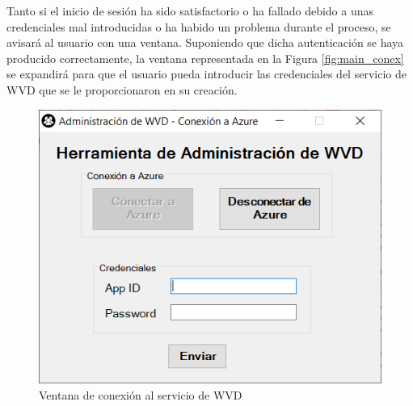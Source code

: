 Tanto si el inicio de sesión ha sido satisfactorio o ha fallado debido a unas credenciales mal introducidas o ha habido un problema durante el proceso, se avisará al usuario con una ventana. Suponiendo que dicha autenticación se haya producido correctamente, la ventana representada en la Figura \ref{fig:main_conex} se expandirá para que el usuario pueda introducir las credenciales del servicio de \acs{WVD} que se le proporcionaron en su creación.

\begin{figure}[h]
  \centering
  \includegraphics[width=0.6\linewidth]{figures/images/main_expand.PNG}
  \caption{Ventana de conexión al servicio de \acs{WVD}}
  \label{fig:main_expand}
\end{figure}